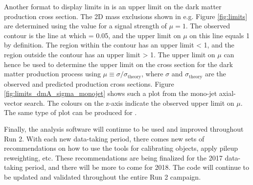 Another format to display limits in is an upper limit on the dark matter production cross section. The 2D mass exclusions shown in e.g. Figure \ref{fig:limits} are determined using the \cls value for a signal strength of $\mu=1$. The observed contour is the line at which \cls = 0.05, and the upper limit on $\mu$ on this line equals 1 by definition. The region within the contour has an upper limit < 1, and the region outside the contour has an upper limit > 1. The upper limit on $\mu$ can hence be used to determine the upper limit on the cross section for the dark matter production process using $\mu \equiv \sigma/\sigma_\text{theory}$, where $\sigma$ and $\sigma_\text{theory}$ are the observed and predicted production cross sections. Figure \ref{fig:limits_dmA_sigma_monojet} shows such a plot from the mono-jet axial-vector search. The colours on the z-axis indicate the observed upper limit on $\mu$. The same type of plot can be produced for \monoZ.

Finally, the \monoZ analysis software will continue to be used and improved throughout Run 2. With each new data-taking period, there comes new sets of recommendations on how to use the tools for calibrating objects, apply pileup reweighting, etc.
These recommendations are being finalized for the 2017 data-taking period, and there will be more to come for 2018. The code will continue to be updated and validated throughout the entire Run 2 campaign.

